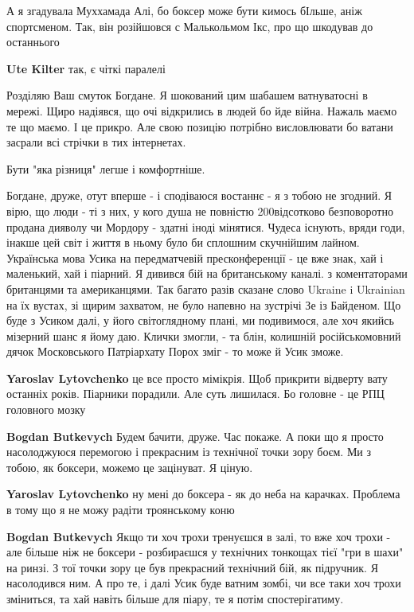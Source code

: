 \begin{itemize}
А я згадувала Муххамада Алі, бо боксер може бути кимось бІльше, аніж
спортсменом. Так, він розійшовся с Малькольмом Ікс, про що шкодував до
останнього

\begin{itemize} %
\textbf{Ute Kilter} так, є чіткі паралелі
\end{itemize} %

Розділяю Ваш смуток Богдане.
Я шокований цим шабашем ватнуватосні в мережі. Щиро надіявся, що очі відкрились в людей бо йде війна.
Нажаль маємо те що маємо. І це прикро.
Але свою позицію потрібно висловлювати бо ватани засрали всі стрічки в тих інтернетах.

Бути "яка різниця" легше і комфортніше.


Богдане, друже, отут вперше - і сподіваюся востаннє - я з тобою не згодний. Я
вірю, що люди - ті з них, у кого душа не повністю 200відсотково безповоротно
продана дияволу чи Мордору - здатні іноді мінятися. Чудеса існують, вряди годи,
інакше цей світ і життя в ньому було би сплошним скучнійшим лайном. Українська
мова Усика на передматчевій пресконференції - це вже знак, хай і маленький, хай
і піарний. Я дивився бій на британському каналі. з коментаторами британцями та
американцями. Так багато разів сказане слово Ukraine i Ukrainian на їх вустах,
зі щирим захватом, не було напевно на зустрічі Зе із Байденом. Що буде з Усиком
далі, у його світоглядному плані, ми подивимося, але хоч якийсь мізерний шанс я
йому даю. Клички змогли, - та блін, колишній російськомовний дячок Московського
Патріархату Порох зміг - то може й Усик зможе.

\begin{itemize} %
\textbf{Yaroslav Lytovchenko} це все просто мімікрія. Щоб прикрити відверту вату останніх років. Піарники порадили. Але суть лишилася. Бо головне - це РПЦ головного мозку

\textbf{Bogdan Butkevych} Будем бачити, друже. Час покаже. А поки що я просто насолоджуюся перемогою і прекрасним із технічної точки зору боєм. Ми з тобою, як боксери, можемо це зацінуват. Я ціную.


\textbf{Yaroslav Lytovchenko} ну мені до боксера - як до неба на карачках. Проблема в тому що я не можу радіти троянському коню

\textbf{Bogdan Butkevych} Якщо ти хоч трохи тренуєшся в залі, то вже хоч трохи - але більше ніж не боксери - розбираєшся у технічних тонкощах тієї "гри в шахи" на ринзі. З тої точки зору це був прекрасний технічний бій, як підручник. Я насолодився ним. А про те, і далі Усик буде ватним зомбі, чи все таки хоч трохи зміниться, та хай навіть більше для піару, те я потім спостерігатиму.



\end{itemize}
\end{itemize}
